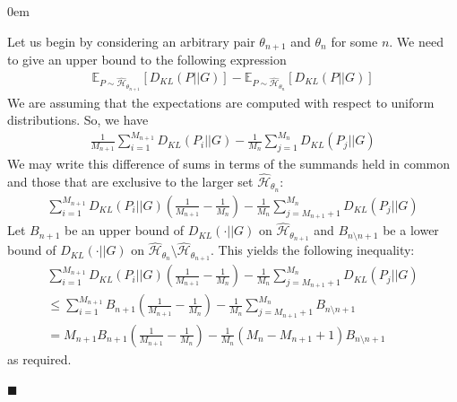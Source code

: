 \documentclass[12pt]{article}
\renewcommand{\qed}{\hfill$\blacksquare$}
\renewenvironment{proof}{\begin{addmargin}[1em]{0em}\begin{newproof}}{\end{newproof}\end{addmargin}\qed}
\begin{document}
\begin{proof}
    Let us begin by considering an arbitrary pair $\theta_{n+1}$ and $\theta_n$ for some $n$. We need to give an upper bound to the following expression
    \begin{gather*}
        \mathds{E}_{P\sim \hat{\mathcal{H}}_{\theta_{n+1}}}[D_{KL}(P || G)] - \mathds{E}_{P\sim \hat{\mathcal{H}}_{\theta_n}}[D_{KL}(P || G)] 
    \end{gather*}
    We are assuming that the expectations are computed with respect to uniform distributions.  So, we have
    \begin{gather*}
       \frac{1}{M_{n+1}} \sum_{i=1}^{M_{n+1}} D_{KL}(P_i||G) - \frac{1}{M_n}\sum_{j=1}^{M_n} D_{KL}(P_j||G)
    \end{gather*}
    We may write this difference of sums in terms of the summands held in common and those that are exclusive to the larger set $\hat{\mathcal{H}}_{\theta_n}$:
    \begin{gather*}
        \sum_{i=1}^{M_{n+1}} D_{KL}(P_i||G)(\frac{1}{M_{n+1}}-\frac{1}{M_n}) - \frac{1}{M_n}\sum_{j=M_{n+1}+1}^{M_n} D_{KL}(P_j||G)
    \end{gather*}
    Let $B_{n+1}$ be an upper bound of $D_{KL}(\cdot||G)$ on $\hat{\mathcal{H}}_{\theta_{n+1}}$ and $B_{n\setminus n+1}$ be a lower bound of $D_{KL}(\cdot||G)$ on $\hat{\mathcal{H}}_{\theta_n} \setminus \hat{\mathcal{H}}_{\theta_{n+1}}$. This yields the following inequality:
        \begin{gather*}
        \sum_{i=1}^{M_{n+1}} D_{KL}(P_i||G)(\frac{1}{M_{n+1}}-\frac{1}{M_n}) - \frac{1}{M_n}\sum_{j=M_{n+1}+1}^{M_n} D_{KL}(P_j||G) \\
        \leq \sum_{i=1}^{M_{n+1}} B_{n+1}(\frac{1}{M_{n+1}}-\frac{1}{M_n}) - \frac{1}{M_n}\sum_{j=M_{n+1}+1}^{M_n} B_{n\setminus n+1}\\
        = M_{n+1}B_{n+1}(\frac{1}{M_{n+1}} - \frac{1}{M_n}) - \frac{1}{M_n}(M_n - M_{n+1} + 1)B_{n\setminus n+1}
    \end{gather*} 
    as required.
\end{proof}
\end{document}
